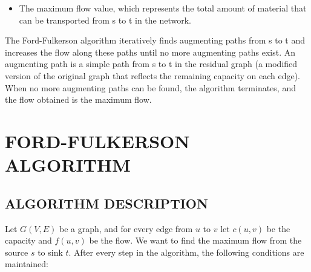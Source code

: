 \documentclass{article}
\begin{document}
{{\begin{enumerate}
\begin{itemize}
    \begin{enumerate}
        \item \textbf{Capacity constraint:} $0 \leq f(u,v) \leq c(u,v)$ for all $(u,v) \in E$. 
        \item \textbf{Flow conservation:} For every node $v \in V - \{s,t\}$, the total incoming flow is equal to the total outgoing flow:\\
        \begin{center}
        \[\sum_{u \in V} f(u,v) = \sum_{w \in V} f(v,w)\]
        \end{center}
    \end{enumerate}
    \vspace{0.5cm}
    \item The maximum flow value, which represents the total amount of material that can be transported from s to t in the network.
    \end{itemize} 
\end{enumerate}

\vspace{0.5cm}
The Ford-Fulkerson algorithm iteratively finds augmenting paths from s to t and increases the flow along these paths until no more augmenting paths exist. An augmenting path is a simple path from s to t in the residual graph (a modified version of the original graph that reflects the remaining capacity on each edge). When no more augmenting paths can be found, the algorithm terminates, and the flow obtained is the maximum flow.
}\cite{kleinberg2006algorithm}
\pagebreak
\section{\textbf{FORD-FULKERSON ALGORITHM}}
\vspace{0.5cm}
\subsection{\textbf{ALGORITHM DESCRIPTION}}
{\fontsize{15}{15}\selectfont 
Let $G(V,E)$ be a graph, and for every edge from $u$ to $v$ let $c(u,v)$ be the capacity and $f(u,v)$ be the flow. We want to find the maximum flow from the source $s$ to sink $t$. After every step in the algorithm, the following conditions are maintained:
\vspace{0.5cm}

}}
\end{document}
